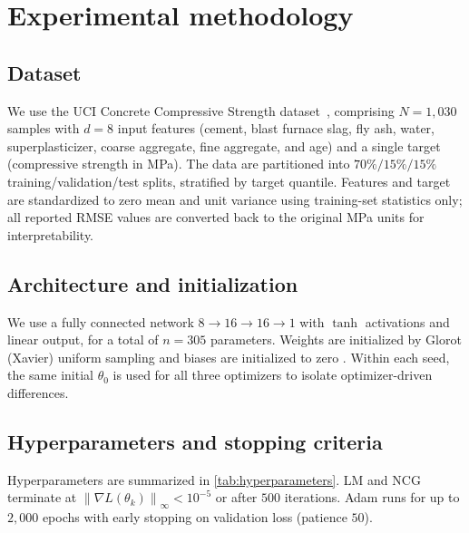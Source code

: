 \documentclass[11pt,letterpaper]{article}
\newcommand{\norm}[1]{\left\|#1\right\|}
\newcommand{\grad}{\nabla}
\theoremstyle{definition}
\begin{document}
\section{Experimental methodology}
\label{sec:methodology}
 
\subsection{Dataset}
 
We use the UCI Concrete Compressive Strength
dataset~\citep{Yeh1998,UCIML}, comprising $N = 1{,}030$ samples with
$d = 8$ input features (cement, blast furnace slag, fly ash, water,
superplasticizer, coarse aggregate, fine aggregate, and age) and a single
target (compressive strength in MPa). The data are partitioned into
$70\%/15\%/15\%$ training/validation/test splits, stratified by target
quantile. Features and target are standardized to zero mean and unit
variance using training-set statistics only; all reported RMSE values are
converted back to the original MPa units for interpretability.
 
\subsection{Architecture and initialization}
 
We use a fully connected network $8 \to 16 \to 16 \to 1$ with
$\tanh$ activations and linear output, for a total of $n = 305$ parameters.
Weights are initialized by Glorot (Xavier) uniform sampling and biases are
initialized to zero \citep{GlorotBengio2010}. Within each seed, the same
initial $\theta_0$ is used for all three optimizers to isolate
optimizer-driven differences.
 
\subsection{Hyperparameters and stopping criteria}
 
Hyperparameters are summarized in \cref{tab:hyperparameters}. LM and NCG
terminate at $\norm{\grad L(\theta_k)}_\infty < 10^{-5}$ or after $500$
iterations. Adam runs for up to $2{,}000$ epochs with early stopping on
validation loss (patience $50$).
 
\end{document}
